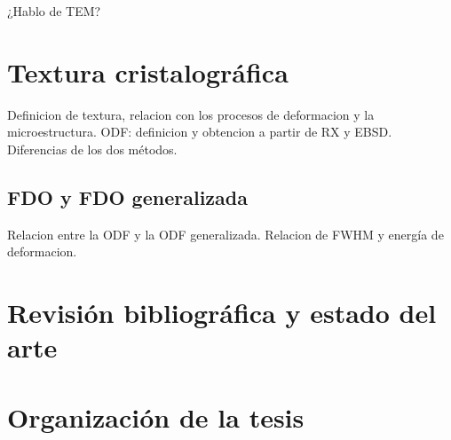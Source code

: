¿Hablo de TEM?
 
\section{Textura cristalográfica}\label{S:Text}
Definicion de textura, relacion con los procesos de deformacion y la microestructura.
ODF: definicion y obtencion a partir de RX y EBSD. Diferencias de los dos métodos.

\subsection{FDO y FDO generalizada}\label{SS:ODF}
Relacion entre la ODF y la ODF generalizada. Relacion de FWHM y energía de deformacion.

\section{Revisión bibliográfica y estado del arte}\label{S:RB}

\section{Organización de la tesis}\label{S:Org}
